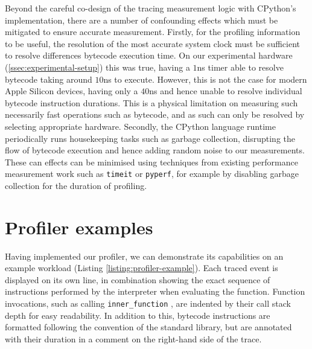 



Beyond the careful co-design of the tracing measurement logic with CPython's implementation, there are a number of confounding effects which must be mitigated to ensure accurate measurement.
Firstly, for the profiling information to be useful, the resolution of the most accurate system clock must be sufficient to resolve differences bytecode execution time. On our experimental hardware (\autoref{ssec:experimental-setup}) this was true, having a $1$ns timer able to resolve bytecode taking around $10$ns to execute. However, this is not the case for modern Apple Silicon devices, having only a $40$ns and hence unable to resolve individual bytecode instruction durations. This is a physical limitation on measuring such necessarily fast operations such as bytecode, and as such can only be resolved by selecting appropriate hardware.
Secondly, the CPython language runtime periodically runs housekeeping tasks such as garbage collection, disrupting the flow of bytecode execution and hence adding random noise to our measurements. These can effects can be minimised using techniques from existing performance measurement work such as \texttt{timeit} or \texttt{pyperf}, for example by disabling garbage collection for the duration of profiling.





\section{Profiler examples}
\label{sec:profiling-bytecode-examples}

Having implemented our profiler, we can demonstrate its capabilities on an example workload (Listing \ref{listing:profiler-example}).
Each traced event is displayed on its own line, in combination showing the exact sequence of instructions performed by the interpreter when evaluating the function. Function invocations, such as calling \texttt{inner\_function} , are indented by their call stack depth for easy readability. In addition to this, bytecode instructions are formatted following the convention of the standard library, but are annotated with their duration in a comment on the right-hand side of the trace.


